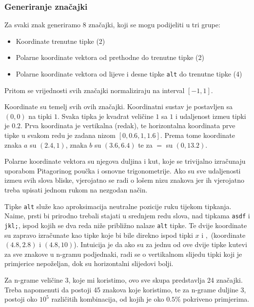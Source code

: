 \documentclass[a4paper,twocolumn]{article}
\begin{document}
\subsubsection{Generiranje zna\v{c}ajki}

Za svaki znak generiramo 8 zna\v{c}ajki, koji se mogu podijeliti u tri grupe:
\begin{itemize}
        \item Koordinate trenutne tipke (2)
        \item Polarne koordinate vektora od prethodne do trenutne tipke (2)
        \item Polarne koordinate vektora od lijeve i desne tipke \texttt{alt}
            do trenutne tipke (4)
\end{itemize}
Pritom se vrijednosti svih zna\v{c}ajki normaliziraju na interval $[-1, 1]$.

Koordinate su temelj svih ovih zna\v{c}ajki. Koordinatni sustav je postavljen
sa $(0,0)$ na tipki $1$. Svaka tipka je kvadrat veli\v{c}ine $1$ sa $1$ i
udaljenost izme\dj u tipki je $0.2$. Prva koordinata je vertikalna (redak), te
horizontalna koordinata prve tipke u svakom redu je zadana nizom $[0, 0.6, 1,
1.6]$. Prema tome koordinate znaka $a$ su $(2.4, 1)$, znaka $b$ su $(3.6, 6.4)$
te za $=$ su $(0, 13.2)$. 

Polarne koordinate vektora su njegova duljina i kut, koje se trivijalno
izra\v{c}unaju uporabom Pitagorinog pou\v{c}ka i osnovne trigonometrije. Ako su
sve udaljenosti izme\dj u svih slova bliske, vjerojatno se radi o lo\v{s}em
nizu znakova jer ih vjerojatno treba upisati jednom rukom na nezgodan
na\v{c}in.

Tipke \texttt{alt} slu\v{z}e kao aproksimacija neutralne pozicije ruku tijekom
tipkanja. Naime, prsti bi prirodno trebali stajati u srednjem redu slova, nad
tipkama \texttt{asdf} i \texttt{jkl;}, ispod kojih se dva reda ni\v{z}e
pribli\v{z}no nalaze \texttt{alt} tipke. Te dvije koordinate su zapravo
izra\v{c}unate kao tipke koje bi bile direkno ispod tipki $x$ i $,$ (koordinate
$(4.8, 2.8)$ i $(4.8, 10)$). Intuicija je da ako su za jednu od ove dvije tipke
kutevi za sve znakove u n-gramu podjednaki, radi se o vertikalnom slijedu tipki
koji je primjerice nepo\v{z}eljan, dok su horizontalni slijedovi bolji.

Za n-grame veli\v{c}ine 3, koje mi koristimo, ovo sve skupa predstavlja 24
zna\v{c}ajki. Treba napomenuti da postoji 45 znakova koje koristimo, te za
n-grame duljine 3, postoji oko $10^5$ razli\v{c}itih kombinacija, od kojih je
oko $0.5\%$ pokriveno primjerima.
\end{document}
